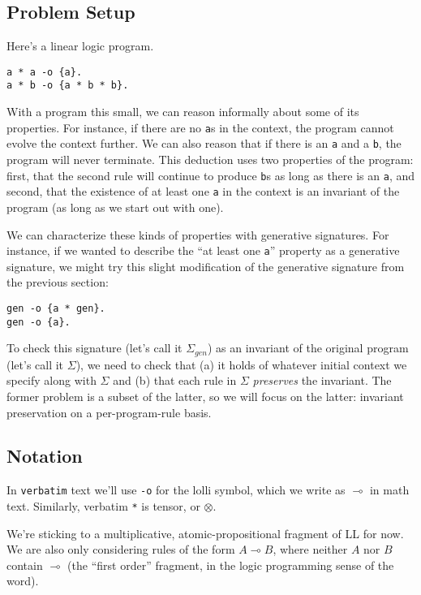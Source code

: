 \documentclass[fullpage, 11pt]{article}
\newcommand{\lolli}{\multimap}
\newcommand{\tensor}{\otimes}
\begin{document}
\subsection{Problem Setup}

Here's a linear logic program.

\begin{verbatim}
a * a -o {a}.
a * b -o {a * b * b}.
\end{verbatim}

With a program this small, we can reason informally about some of its
properties. For instance, if there are no \verb|a|s in the context, the
program cannot evolve the context further. We can also reason that if there
is an \verb|a| and a \verb|b|, the program will never terminate. This
deduction uses two properties of the program: first, that the second
rule will continue to produce \verb|b|s as long as there is an \verb|a|,
and second, that the existence of at least one \verb|a| in the context is
an invariant of the program (as long as we start out with one).

We can characterize these kinds of properties with generative signatures.
For instance, if we wanted to describe
the ``at least one \verb|a|'' property as a generative signature, we might
try this slight modification of the generative signature from the previous
section:

\begin{verbatim}
gen -o {a * gen}.
gen -o {a}.
\end{verbatim}

To check this signature (let's call it $\Sigma_{gen}$) as an invariant of
the original program (let's call it $\Sigma$), we need to check that (a) it
holds of whatever initial context we specify along with $\Sigma$ and (b)
that each rule in $\Sigma$ {\em preserves} the invariant. The former
problem is a subset of the latter, so we will focus on the latter:
invariant preservation on a per-program-rule basis.


\subsection{Notation}

In \verb|verbatim| text we'll use \verb|-o| for the lolli symbol, which we write
as $\lolli$ in math text. Similarly, verbatim \verb|*| is tensor, or
$\tensor$.

We're sticking to a  multiplicative, atomic-propositional fragment of LL
for now. We are also only considering rules of the form $A \lolli B$, where
neither $A$ nor $B$ contain $\lolli$ (the ``first order'' fragment, in the
logic programming sense of the word).
\end{document}
